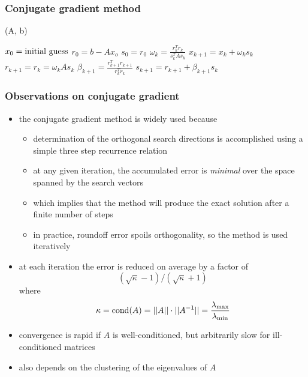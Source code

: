 \begin{frame}[fragile]
%
  \frametitle{Conjugate gradient method}
%
  \begin{center}
    \begin{minipage}{.85\linewidth}
      \begin{algorithm}[H]
        \label{alg:conjugate-gradient}
%
          \dontprintsemicolon
          \setalcaphskip{0ex}
%
          \caption{\CGM(A, b)}
%
          $x_{0} = {\rm initial\ guess}$\;
          $r_{0} = b - A x_{o}$\;
          $s_{0} = r_{0}$ \;
           {
            $\omega_{k} = \frac{r^{T}_{k} r_{k}}{s_{k}^{T}As_{k}}$ \;
            $x_{k+1}  = x_{k} + \omega_{k} s_{k}$ \;
            $r_{k+1} = r_{k} = \omega_{k} A s_{k}$ \;
            $\beta_{k+1}  = \frac{r^{T}_{k+1} r_{k+1}}{r^{T}_{k} r_{k}}$ \;
            $s_{k+1}   = r_{k+1} + \beta_{k+1} s_{k}$
          }
%
        \end{algorithm}
      \end{minipage}
    \end{center}
%
\end{frame}

\begin{frame}[fragile]
%
  \frametitle{Observations on conjugate gradient}
%
  \begin{itemize}
%
  \item the conjugate gradient method is widely used because
    \begin{itemize}
    \item determination of the orthogonal search directions is accomplished using a simple
      three step recurrence relation
    \item at any given iteration, the accumulated error is {\em minimal} over the space spanned
      by the search vectors
    \item which implies that the method will produce the exact solution after a finite number
      of steps
    \item in practice, roundoff error spoils orthogonality, so the method is used iteratively
    \end{itemize}
%
  \item at each iteration the error is reduced on average by a factor of
    \begin{equation}
      (\sqrt{\kappa} - 1)/(\sqrt{\kappa} + 1)
    \end{equation}
    where 
    \begin{equation}
      \kappa
      = {\rm cond}(A)
      = ||A|| \cdot ||A^{-1}||
      = \frac{\lambda_{\rm max}}{\lambda_{\rm min}}
    \end{equation}
%
  \item convergence is rapid if $A$ is well-conditioned, but arbitrarily slow for
    ill-conditioned matrices
  \item also depends on the clustering of the eigenvalues of $A$
%
  \end{itemize}
%
\end{frame}

